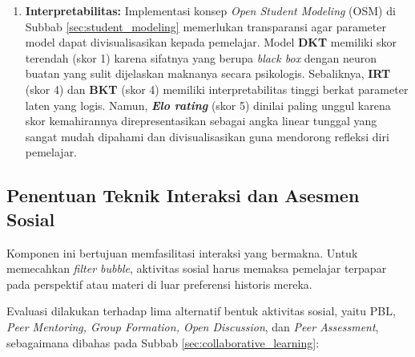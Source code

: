 \begin{enumerate}
    \item \textbf{Interpretabilitas:} Implementasi konsep \textit{Open Student Modeling} (OSM) di Subbab \ref{sec:student_modeling} memerlukan transparansi agar parameter model dapat divisualisasikan kepada pemelajar. Model \textbf{DKT} memiliki skor terendah (skor 1) karena sifatnya yang berupa \textit{black box} dengan neuron buatan yang sulit dijelaskan maknanya secara psikologis. Sebaliknya, \textbf{IRT} (skor 4) dan \textbf{BKT} (skor 4) memiliki interpretabilitas tinggi berkat parameter laten yang logis. Namun, \textbf{\textit{Elo rating}} (skor 5) dinilai paling unggul karena skor kemahirannya direpresentasikan sebagai angka linear tunggal yang sangat mudah dipahami dan divisualisasikan guna mendorong refleksi diri pemelajar.
\end{enumerate}

\subsection{Penentuan Teknik Interaksi dan Asesmen Sosial}
\label{ssec:keputusan_asesmen_sosial}
Komponen ini bertujuan memfasilitasi interaksi yang bermakna. Untuk memecahkan \textit{filter bubble}, aktivitas sosial harus memaksa pemelajar terpapar pada perspektif atau materi di luar preferensi historis mereka.

Evaluasi dilakukan terhadap lima alternatif bentuk aktivitas sosial, yaitu PBL, \textit{Peer Mentoring, Group Formation, Open Discussion}, dan \textit{Peer Assessment}, sebagaimana dibahas pada Subbab \ref{sec:collaborative_learning}:

